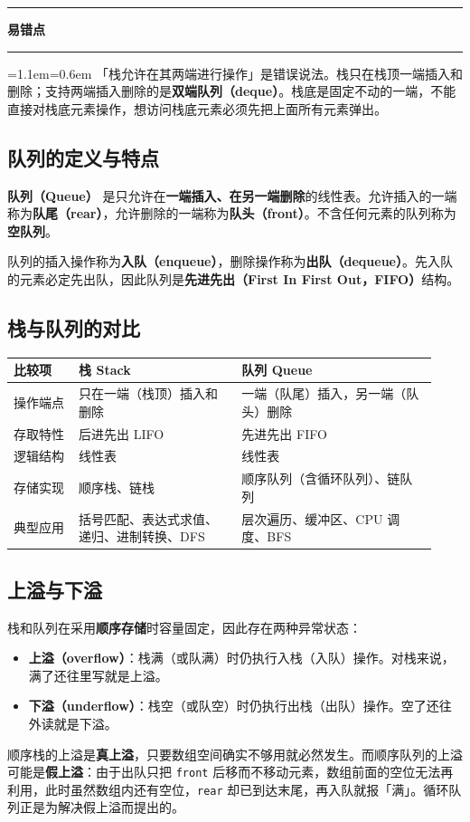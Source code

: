 \documentclass[11pt,openany,UTF8]{ctexbook}
\newcommand{\callouthead}[2]{%
  \par\addvspace{7pt}\noindent
  {\color{#1}\rule[-0.15em]{3pt}{1.05em}}\hspace{0.5em}%
  {\bfseries\color{#1}#2}\par\nobreak\vspace{-0.35em}%
  {\color{rulesep}\hrule height 0.4pt}\nobreak\vspace{0.45em}%
  \begingroup\small\setlength{\parindent}{0pt}%
  \leftskip=1.1em\rightskip=0.6em\noindent\ignorespaces}
\newcommand{\calloutend}{\par\endgroup\addvspace{7pt}}
\newenvironment{callwarn}[1]{\callouthead{warnbar}{#1}}{\calloutend}
\begin{document}
\begin{callwarn}{易错点}
「栈允许在其两端进行操作」是错误说法。栈只在栈顶一端插入和删除；支持两端插入删除的是\textbf{双端队列（deque）}。栈底是固定不动的一端，不能直接对栈底元素操作，想访问栈底元素必须先把上面所有元素弹出。

\end{callwarn}

\subsection{队列的定义与特点}

\textbf{队列（Queue）} 是只允许在\textbf{一端插入、在另一端删除}的线性表。允许插入的一端称为\textbf{队尾（rear）}，允许删除的一端称为\textbf{队头（front）}。不含任何元素的队列称为\textbf{空队列}。

队列的插入操作称为\textbf{入队（enqueue）}，删除操作称为\textbf{出队（dequeue）}。先入队的元素必定先出队，因此队列是\textbf{先进先出（First In First Out，FIFO）}结构。

\subsection{栈与队列的对比}

\begingroup\small\setlength{\tabcolsep}{4.0pt}
\begin{longtable}{@{}L{0.1428\linewidth}L{0.3571\linewidth}L{0.4285\linewidth}@{}}
\toprule
\textbf{比较项} & \textbf{栈 Stack} & \textbf{队列 Queue} \\
\midrule
\endhead
操作端点 & 只在一端（栈顶）插入和删除 & 一端（队尾）插入，另一端（队头）删除 \\
存取特性 & 后进先出 LIFO & 先进先出 FIFO \\
逻辑结构 & 线性表 & 线性表 \\
存储实现 & 顺序栈、链栈 & 顺序队列（含循环队列）、链队列 \\
典型应用 & 括号匹配、表达式求值、递归、进制转换、DFS & 层次遍历、缓冲区、CPU 调度、BFS \\
\bottomrule
\end{longtable}
\endgroup

\subsection{上溢与下溢}

栈和队列在采用\textbf{顺序存储}时容量固定，因此存在两种异常状态：

\begin{itemize}
\item \textbf{上溢（overflow）}：栈满（或队满）时仍执行入栈（入队）操作。对栈来说，满了还往里写就是上溢。
\item \textbf{下溢（underflow）}：栈空（或队空）时仍执行出栈（出队）操作。空了还往外读就是下溢。
\end{itemize}
顺序栈的上溢是\textbf{真上溢}，只要数组空间确实不够用就必然发生。而顺序队列的上溢可能是\textbf{假上溢}：由于出队只把 \texttt{front} 后移而不移动元素，数组前面的空位无法再利用，此时虽然数组内还有空位，\texttt{rear} 却已到达末尾，再入队就报「满」。循环队列正是为解决假上溢而提出的。
\end{document}
